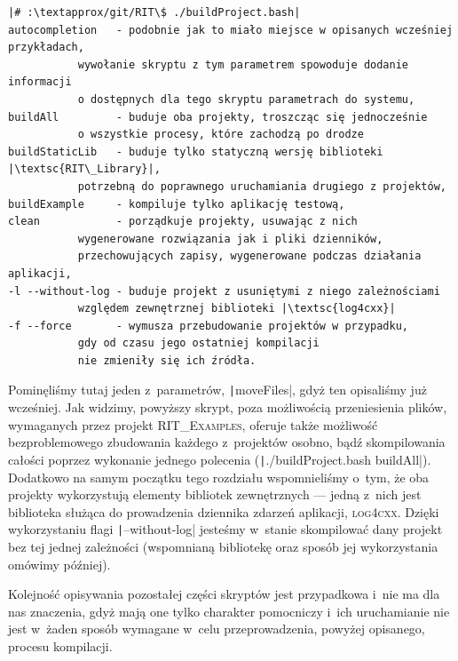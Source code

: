 \begin{verbatim}
|# :\textapprox/git/RIT\$ ./buildProject.bash|
autocompletion   - podobnie jak to miało miejsce w opisanych wcześniej przykładach, 
		   wywołanie skryptu z tym parametrem spowoduje dodanie informacji 
		   o dostępnych dla tego skryptu parametrach do systemu,
buildAll         - buduje oba projekty, troszcząc się jednocześnie 
		   o wszystkie procesy, które zachodzą po drodze
buildStaticLib   - buduje tylko statyczną wersję biblioteki |\textsc{RIT\_Library}|, 
		   potrzebną do poprawnego uruchamiania drugiego z projektów,
buildExample     - kompiluje tylko aplikację testową,
clean            - porządkuje projekty, usuwając z nich 
		   wygenerowane rozwiązania jak i pliki dzienników, 
		   przechowujących zapisy, wygenerowane podczas działania aplikacji,
-l --without-log - buduje projekt z usuniętymi z niego zależnościami
		   względem zewnętrznej biblioteki |\textsc{log4cxx}|
-f --force       - wymusza przebudowanie projektów w przypadku, 
		   gdy od czasu jego ostatniej kompilacji 
		   nie zmieniły się ich źródła.
\end{verbatim}

Pominęliśmy tutaj jeden z~parametrów, \texttt|moveFiles|, gdyż ten opisaliśmy już wcześniej. Jak widzimy, powyższy skrypt, poza możliwością przeniesienia plików, wymaganych przez projekt \textsc{RIT\_Examples}, oferuje także możliwość bezproblemowego zbudowania każdego z~projektów osobno, bądź skompilowania całości poprzez wykonanie jednego polecenia (\texttt|./buildProject.bash buildAll|). Dodatkowo na samym początku tego rozdziału wspomnieliśmy o~tym, że oba projekty wykorzystują elementy bibliotek zewnętrznych --- jedną z~nich jest biblioteka służąca do prowadzenia dziennika zdarzeń aplikacji, \textsc{log4cxx}. Dzięki wykorzystaniu flagi \texttt|--without-log| jesteśmy w~stanie skompilować dany projekt bez tej jednej zależności (wspomnianą bibliotekę oraz sposób jej wykorzystania omówimy później).

Kolejność opisywania pozostałej części skryptów jest przypadkowa i~nie ma dla nas znaczenia, gdyż mają one tylko charakter pomocniczy i~ich uruchamianie nie jest w~żaden sposób wymagane w~celu przeprowadzenia, powyżej opisanego, procesu kompilacji.


